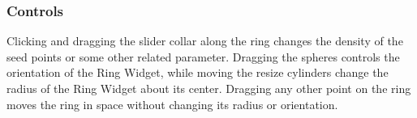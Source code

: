 \subsubsection{Controls} Clicking and dragging the slider collar along the
ring changes the density of the seed points or some other related
parameter.  Dragging the spheres controls the orientation of the Ring
Widget, while moving the resize cylinders change the radius of the Ring
Widget about its center.  Dragging any other point on the ring moves the
ring in space without changing its radius or orientation.


